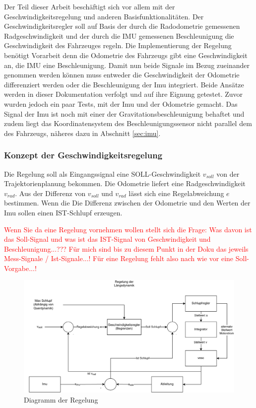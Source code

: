 Der Teil dieser Arbeit beschäftigt sich vor allem mit der Geschwindigkeitsregelung und anderen Basisfunktionalitäten. 
Der Geschwindigkeitsregler soll auf Basis der durch die Radodometrie gemessenen Radgeschwindigkeit und der durch die IMU gemessenen Beschleunigung die Geschwindigkeit des Fahrzeuges regeln. Die Implementierung der Regelung benötigt Vorarbeit denn die Odometrie des Fahrzeugs gibt eine Geschwindigkeit an, die IMU eine Beschleunigung. 
Damit nun beide Signale im Bezug zueinander genommen werden können muss entweder die Geschwindigkeit der Odometrie differenziert werden oder die Beschleunigung der Imu integriert. 
Beide Ansätze werden in dieser Dokumentation verfolgt und auf ihre Eignung getestet. Zuvor wurden jedoch ein paar Tests, mit der Imu und der Odometrie gemacht. 
Das Signal der Imu ist noch mit einer der Gravitationsbeschleunigung behaftet und zudem liegt das Koordinatensystem des Beschleunigungssensor nicht parallel dem des Fahrzeugs, näheres dazu in Abschnitt \ref{sec:imu}. 

\subsubsection{Konzept der Geschwindigkeitsregelung}
Die Regelung soll als Eingangssignal eine SOLL-Geschwindigkeit $v_{soll}$ von der Trajektorienplanung bekommen. Die Odometrie liefert eine Radgeschwindigkeit $v_{rad}$. Aus der Differenz von $v_{soll}$ und $v_{rad}$ lässt sich eine Regelabweichung $e$ bestimmen. Wenn die Die Differenz zwischen der Odometrie und den Werten der Imu sollen einen IST-Schlupf erzeugen.

\textcolor{red}{Wenn Sie da eine Regelung vornehmen wollen stellt sich die Frage: Was davon ist das Soll-Signal und was ist das IST-Signal von Geschwindigkeit und Beschleunigung...??? Für mich sind bis zu diesem Punkt in der Doku das jeweils \glqq{}Mess-Signale / Ist-Signale\grqq{}...! Für eine Regelung fehlt also nach wie vor eine Soll-Vorgabe...!}

\begin{figure}
    \centering
    \hspace*{-0.4cm}\includegraphics[width=1.05\textwidth]{bilder/SEP-Plan.png}
    \caption{Diagramm der Regelung}
    \label{fig:diagramRegelung}
\end{figure}


